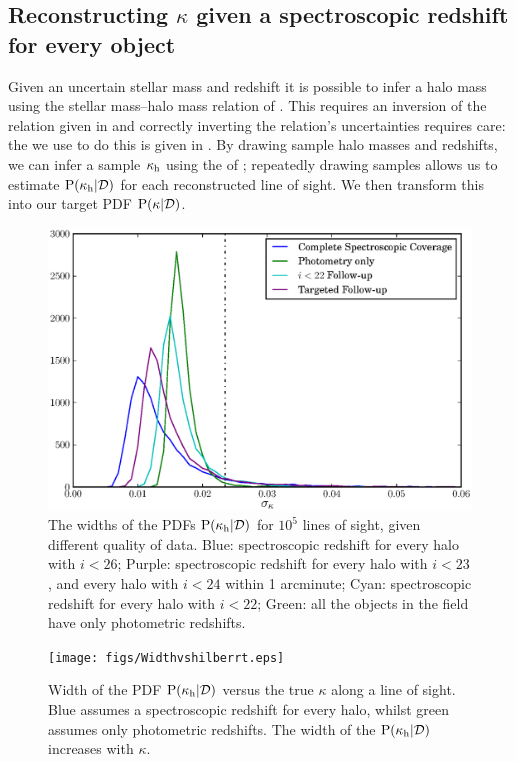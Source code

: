 \documentclass[useAMS,usenatbib]{mn2e}
\begin{document}
\subsection{Reconstructing $\kappa$ given a spectroscopic redshift for every object}

Given an uncertain stellar mass and redshift it is possible to infer a
halo mass using the stellar mass--halo mass relation of
\citet{BehrooziEtal2010}. This \proceedure requires an inversion of the
relation given in \citet{BehrooziEtal2010} and correctly inverting the
relation's uncertainties requires care: the \proceedure we use to do this
is given in . By drawing sample halo masses
and redshifts, we can infer a sample $\kappa_{\rm h}$ using the \proceedure of
; repeatedly drawing samples allows us to
estimate ${\rm P}(\kappa_{\rm h}|{\mathcal{D}})$ for each reconstructed line of sight. We then
transform this into our target PDF ${\rm P}(\kappa|{\mathcal{D}})$.

\begin{figure}
\includegraphics[width=\columnwidth]{figs/Width.eps}
\caption{The widths of the \infered PDFs ${\rm P}(\kappa_{\rm h}|{\mathcal{D}})$ for
$10^5$ lines of sight, given different quality of data. Blue:
spectroscopic redshift for every halo with $i<26$; Purple: 
spectroscopic redshift for every halo with $i<23$, and every halo with $i<24$
within 1 arcminute; Cyan: spectroscopic redshift for every halo with $i<22$; 
Green: all the objects in the field have only photometric redshifts.}
\label{fig:reconwidths}
\end{figure}

\begin{figure}
\texttt{[image: figs/Widthvshilberrt.eps]}
\caption{Width of the \infered PDF ${\rm P}(\kappa_{\rm h}|{\mathcal{D}})$ versus the true
$\kappa$ along a line of sight. Blue assumes a spectroscopic redshift for
every halo, whilst green assumes only photometric redshifts. The width of the
\infered ${\rm P}(\kappa_{\rm h}|{\mathcal{D}})$ increases with $\kappa$.}
\label{fig:widthsvsH}
\end{figure}
\end{document}
